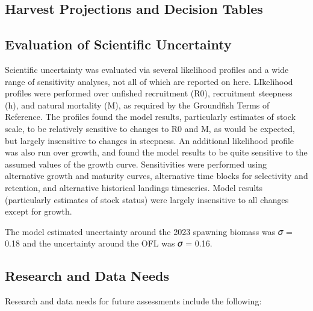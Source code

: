 \documentclass[11pt,
  english,
  letterpaper,
]{article}
\begin{document}
\hypertarget{harvest-projections-and-decision-tables}{%
\subsection{Harvest Projections and Decision Tables}\label{harvest-projections-and-decision-tables}}

\hypertarget{evaluation-of-scientific-uncertainty}{%
\subsection{Evaluation of Scientific Uncertainty}\label{evaluation-of-scientific-uncertainty}}

Scientific uncertainty was evaluated via several likelihood profiles and a wide range of sensitivity analyses, not all of which are reported on here. LIkelihood profiles were performed over unfished recruitment (R0), recruitment steepness (h), and natural mortality (M), as required by the Groundfish Terms of Reference. The profiles found the model results, particularly estimates of stock scale, to be relatively sensitive to changes to R0 and M, as would be expected, but largely insensitive to changes in steepness. An additional likelihood profile was also run over growth, and found the model results to be quite sensitive to the assumed values of the growth curve. Sensitivities were performed using alternative growth and maturity curves, alternative time blocks for selectivity and retention, and alternative historical landings timeseries. Model results (particularly estimates of stock status) were largely insensitive to all changes except for growth.

The model estimated uncertainty around the 2023 spawning biomass was 𝜎 = 0.18 and the uncertainty around the OFL was 𝜎 = 0.16.

\hypertarget{research-and-data-needs-1}{%
\subsection{Research and Data Needs}\label{research-and-data-needs-1}}

Research and data needs for future assessments include the following:
\end{document}
